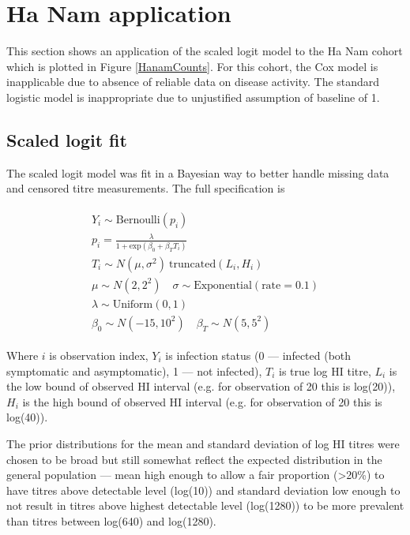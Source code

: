 \documentclass[12pt]{article}
\begin{document}
\section{Ha Nam application}

This section shows an application of the scaled logit model to the Ha Nam cohort which is plotted in Figure \ref{HanamCounts}. For this cohort, the Cox model is inapplicable due to absence of reliable data on disease activity. The standard logistic model is inappropriate due to unjustified assumption of baseline of 1.

\subsection{Scaled logit fit}

The scaled logit model was fit in a Bayesian way to better handle missing data and censored titre measurements. The full specification is

\begin{align*}
\begin{gathered}
Y_i \sim \text{Bernoulli}(p_i) \\
p_i = \frac{\lambda}{1 + \text{exp}(\beta_0 + \beta_T T_i)} \\
T_i \sim N(\mu, \sigma^2) \ \text{truncated}(L_{i}, H_{i}) \\
\mu \sim N(2, 2^2) \quad \sigma \sim \text{Exponential}(\text{rate} = 0.1) \\
\lambda \sim \text{Uniform}(0, 1) \\
\beta_0 \sim N(-15, 10^2) \quad \beta_T \sim N(5, 5^2)
\end{gathered}
\end{align*}

Where $i$ is observation index, $Y_i$ is infection status (0 --- infected (both symptomatic and asymptomatic), 1 --- not infected), $T_i$ is true log HI titre, $L_i$ is the low bound of observed HI interval (e.g. for observation of 20 this is log(20)), $H_i$ is the high bound of observed HI interval (e.g. for observation of 20 this is log(40)).

The prior distributions for the mean and standard deviation of log HI titres were chosen to be broad but still somewhat reflect the expected distribution in the general population --- mean high enough to allow a fair proportion (>20\%) to have titres above detectable level (log(10)) and standard deviation low enough to not result in titres above highest detectable level (log(1280)) to be more prevalent than titres between log(640) and log(1280).
\end{document}

